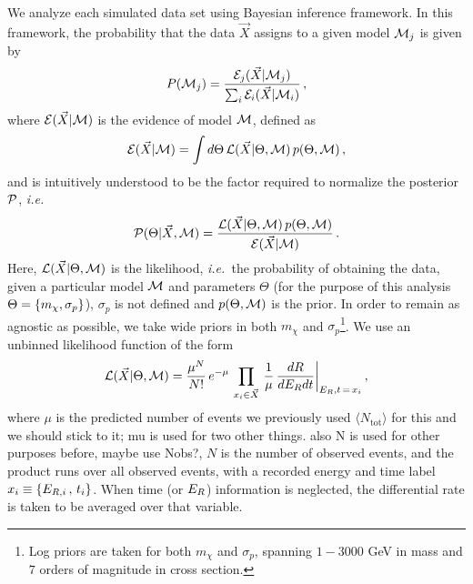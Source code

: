 \documentclass[11pt]{article}
\newcommand{\ie}{{\it i.e.~}}  \newcommand{\eg}{{\it e.g.~}}
\newcommand{\vgColor}{magenta}
\newcommand{\vg}[1]{{\color{\vgColor} #1}}
\begin{document}
We analyze each simulated data set using Bayesian inference framework. In this framework, the probability that the data $\vec{X}$ assigns to a given model ${\cal M}_j$ is given by
\begin{equation}\label{eq:probs}
P({\cal M}_j) = \frac{{\cal E}_j(\vec{X}|{\cal M}_j)}{\sum_i {\cal E}_i(\vec{X}|{\cal M}_i)} \, ,
\end{equation}
where ${\cal E}(\vec{X}|{\cal M})$ is the evidence of model ${\cal M}$, defined as
\begin{equation}\label{eq:evidence}
{\cal E}(\vec{X}|{\cal M}) = \int d\Theta \, {\cal L}(\vec{X}|\Theta,{\cal M}) \, p(\Theta,{\cal M}) \, ,
\end{equation}
and is intuitively understood to be the factor required to normalize the posterior ${ \cal P}$, \ie
\begin{equation}\label{eq:posterior}
{ \cal P}(\Theta | \vec{X}, {\cal M}) = \frac{{\cal L}(\vec{X}|\Theta,{\cal M})\, p(\Theta,{\cal M})}{{\cal E}(\vec{X}|{\cal M})} \, . 
\end{equation}
Here, ${\cal L}(\vec{X}|\Theta,{\cal M})$ is the likelihood, \ie the probability of obtaining the data, given a particular model ${\cal M}$ and parameters $\Theta$ (for the purpose of this analysis $\Theta = \left\{ m_\chi, \sigma_p \right\}$), \vg{$\sigma_p$ is not defined} and $p(\Theta, {\cal M})$ is the prior. In order to remain as agnostic as possible, we take wide priors in both $m_\chi$ and $\sigma_p$\footnote{Log priors are taken for both $m_\chi$ and $\sigma_p$, spanning $1-3000$ GeV in mass and $7$ orders of magnitude in cross section.}. We use an unbinned likelihood function of the form
\begin{equation}\label{eq:likelihood}
{\cal L}(\vec{X}|\Theta,{\cal M}) = \frac{\mu^N}{N!} \, e^{-\mu} \, \prod_{x_i \in \vec{X}}\, \frac{1}{\mu} \, \frac{dR}{dE_R dt} \bigg|_{E_R,t \, = \, x_i} \, ,
\end{equation}
where $\mu$ is the predicted number of events \vg{we previously used $\langle N_\mathrm{tot}\rangle$ for this and we should stick to it; mu is used for two other things. also N is used for other purposes before, maybe use Nobs?}, $N$ is the number of observed events, and the product runs over all observed events, with a recorded energy and time label $x_i \equiv \left\{ E_{R,i} \, , \, t_i \right\}$. When time (or $E_R$) information is neglected, the differential rate is taken to be averaged over that variable. 
\end{document}
